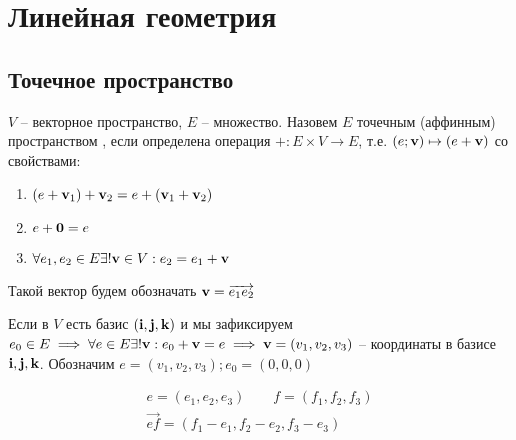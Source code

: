 \documentclass[main]{subfiles}
\begin{document}
\part{Линейная геометрия}
\chapter{Точечное пространство}
\begin{definition}
    $V$ -- векторное пространство, $E$ -- множество. Назовем $E$ точечным (аффинным)
    пространством , если определена операция $+: E\times V \to E$, т.е. $(e; \mathbf{v}) \mapsto (e+\mathbf{v})$
    со свойствами:
    \begin{enumerate}
        \item $(e+\mathbf{v}_1) + \mathbf{v}_2 = e + (\mathbf{v}_1 + \mathbf{v}_2)$
        \item $e + \mathbf{0} = e$
        \item $\forall e_1, e_2 \in E \exists! \mathbf{v} \in V: e_2 = e_1 + \mathbf{v}$
    \end{enumerate}
    Такой вектор будем обозначать $\mathbf{v} = \overrightarrow{e_1 e_2}$

    Если в $V$ есть базис $(\mathbf{i}, \mathbf{j}, \mathbf{k})$ и мы зафиксируем
    $e_0 \in E \implies \forall e \in E \exists! \mathbf{v}:e_0 + \mathbf{v} = e
        \implies \mathbf{v} = (v_1, v_2, v_3)$ -- координаты в базисе $\mathbf{i}, \mathbf{j}, \mathbf{k}$.
    Обозначим $e = (v_1, v_2, v_3); e_0 = (0,0,0)$
\end{definition}

\begin{remark}
    \begin{gather*}
        e = (e_1, e_2, e_3) \qquad f = (f_1, f_2, f_3)\\
        \overrightarrow{ef} = (f_1 - e_1, f_2 - e_2, f_3 - e_3)
    \end{gather*}
\end{remark}
\end{document}
